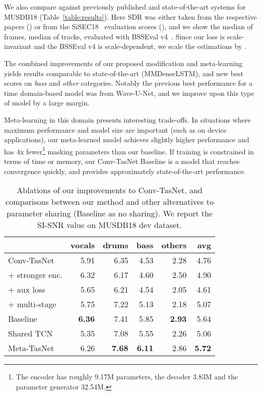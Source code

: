 \documentclass{article}
\begin{document}
We also compare against previously published and state-of-the-art systems for MUSDB18 (Table~\ref{table:results}). 
Here SDR was either taken from the respective papers (\cite{chandna2017monoaural}\cite{lluis2018end}\cite{open-unmix}) or from the SiSEC18~\cite{SiSEC18} evaluation scores (\cite{stoller2018wave}\cite{liu2018denoising}\cite{takahashi2018mmdenselstm}), and we show the median of frames, median of tracks, evaluated with BSSEval v4~\cite{SiSEC18}. Since our loss is scale-invariant and the BSSEval v4 is scale-dependent, we scale the estimations  by .

The combined improvements of our proposed modification and meta-learning yields results comparable to state-of-the-art (MMDenseLSTM), and new best scores on \emph{bass} and \emph{other} categories.  Notably the previous best performance for a time domain-based model was from Wave-U-Net, and we improve upon this type of model by a large margin.

Meta-learning in this domain presents interesting trade-offs.  In situations where maximum performance and model size are important (such as on device applications), our meta-learned model achieves slightly higher performance and has 4x fewer\footnote{The encoder has roughly 9.17M parameters, the decoder 3.83M and the parameter generator 32.54M.} masking parameters than our baseline.  If training is constrained in terms of time or memory, our Conv-TasNet Baseline is a model that reaches convergence quickly, and provides approximately state-of-the-art performance.

\begin{table}
\footnotesize
\begin{tabular}{l r r r r r}
\toprule
& \textbf{vocals} & \textbf{drums} & \textbf{bass}  & \textbf{others} & \textbf{avg}\\
\midrule
Conv-TasNet &  5.91 & 6.35 & 4.53 & 2.28 &  4.76\\
\hspace{3 mm} + stronger enc. & 6.32  & 6.17 & 4.60 & 2.50& 4.90\\
\hspace{3 mm} + aux loss & 5.65 & 6.21 & 4.54 & 2.05 & 4.61\\
\hspace{3 mm} + multi-stage & 5.75 & 7.22 & 5.13 & 2.18 & 5.07\\
\midrule
Baseline & \textbf{6.36} & 7.41 & 5.85 & \textbf{2.93} & 5.64\\
Shared TCN & 5.35 & 7.08 & 5.55 & 2.26 & 5.06\\
\midrule
Meta-TasNet & 6.26 & \textbf{7.68} & \textbf{6.11} & 2.86  & \textbf{5.72}\\
\bottomrule
\end{tabular}
\caption{Ablations of our improvements to Conv-TasNet, and comparisons between our method and other alternatives to parameter sharing (Baseline as no sharing).  We report the SI-SNR value on MUSDB18 dev dataset.}
\label{table:ablation}
\end{table}
\end{document}
